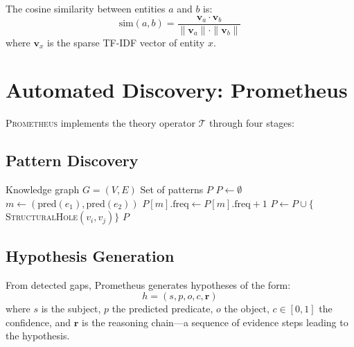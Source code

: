 \documentclass[11pt,twocolumn]{article}
\begin{document}
The cosine similarity between entities $a$ and $b$ is:
\begin{equation}
  \text{sim}(a,b) = \frac{\mathbf{v}_a \cdot \mathbf{v}_b}{\|\mathbf{v}_a\| \cdot \|\mathbf{v}_b\|}
\end{equation}
where $\mathbf{v}_x$ is the sparse TF-IDF vector of entity $x$.

\section{Automated Discovery: Prometheus}
\label{sec:prometheus}

\textsc{Prometheus} implements the theory operator $\mathcal{T}$ through four stages:

\subsection{Pattern Discovery}

\begin{algorithm}[h]
\caption{Structural Pattern Mining}
\label{alg:pattern}
\begin{algorithmic}[1]
\REQUIRE Knowledge graph $G = (V, E)$
\ENSURE Set of patterns $P$
\STATE $P \leftarrow \emptyset$
  \STATE $m \leftarrow (\text{pred}(e_1), \text{pred}(e_2))$ 
  \STATE $P[m].\text{freq} \leftarrow P[m].\text{freq} + 1$
\ENDFOR
{}
    \STATE $P \leftarrow P \cup \{$\textsc{StructuralHole}$(v_i, v_j)\}$
  \ENDIF
\ENDFOR
\RETURN $P$
\end{algorithmic}
\end{algorithm}

\subsection{Hypothesis Generation}

From detected gaps, Prometheus generates hypotheses of the form:
\begin{equation}
  h = (s, p, o, c, \mathbf{r})
\end{equation}
where $s$ is the subject, $p$ the predicted predicate, $o$ the object, $c \in [0,1]$ the confidence, and $\mathbf{r}$ is the reasoning chain---a sequence of evidence steps leading to the hypothesis.
\end{document}
